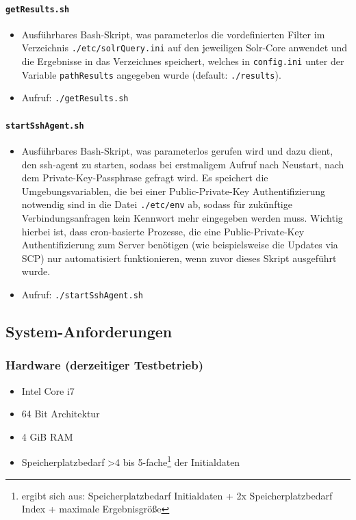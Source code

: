 \documentclass[10pt]{article}
\begin{document}
\paragraph{\texttt{getResults.sh}}
\label{sec:para:getResults}
\begin{itemize}
	\item Ausführbares Bash-Skript, was parameterlos die vordefinierten Filter im Verzeichnis \texttt{./etc/solrQuery.ini} auf den jeweiligen Solr-Core anwendet und die Ergebnisse in das Verzeichnes speichert, welches in \texttt{config.ini} unter der Variable \texttt{pathResults} angegeben wurde (default: \texttt{./results}).
	\item Aufruf: \texttt{./getResults.sh}
\end{itemize}

\begin{minipage}{\linewidth}
\paragraph{\texttt{startSshAgent.sh}}
\label{sec:para:startSshAgent}
\begin{itemize}
	\item Ausführbares Bash-Skript, was parameterlos gerufen wird und dazu dient, den ssh-agent zu starten, sodass bei erstmaligem Aufruf nach Neustart, nach dem Private-Key-Passphrase gefragt wird. Es speichert die Umgebungsvariablen, die bei einer Public-Private-Key Authentifizierung notwendig sind in die Datei \texttt{./etc/env} ab, sodass für zukünftige Verbindungsanfragen kein Kennwort mehr eingegeben werden muss. Wichtig hierbei ist, dass cron-basierte Prozesse, die eine Public-Private-Key Authentifizierung zum Server benötigen (wie beispielsweise die Updates via SCP) nur automatisiert funktionieren, wenn zuvor dieses Skript ausgeführt wurde.
	\item Aufruf: \texttt{./startSshAgent.sh} \\
\end{itemize}
\end{minipage}


\subsection{System-Anforderungen}

\subsubsection{Hardware (derzeitiger Testbetrieb)}
\begin{itemize}
	\item Intel Core i7
	\item 64 Bit Architektur
	\item 4 GiB RAM
	\item Speicherplatzbedarf \textgreater 4 bis 5-fache\footnote{ergibt sich aus: Speicherplatzbedarf Initialdaten + 2x Speicherplatzbedarf Index + maximale Ergebnisgröße} der Initialdaten
\end{itemize}
\end{document}
